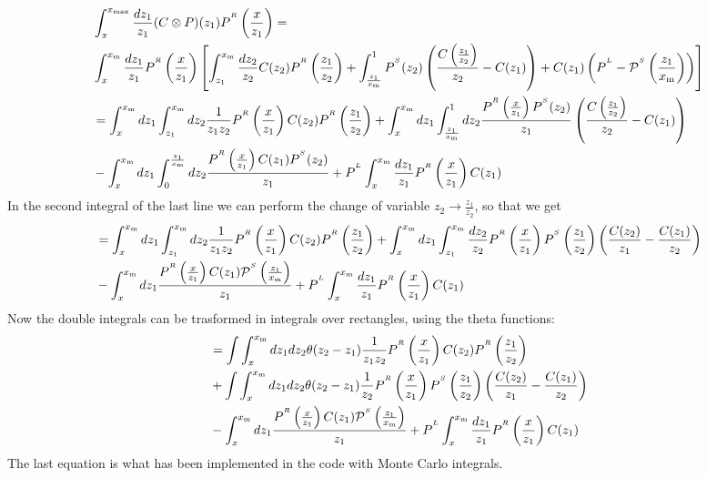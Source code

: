 \documentclass[a4paper]{article}
\newcommand{\PR}[0]{P^{^R}}
\newcommand{\PS}[0]{P^{^S}}
\newcommand{\PmS}[0]{\mathcal{P}^{^S}}
\newcommand{\PL}[0]{P^{^L}}
\newcommand{\xm}[0]{x_{\rm m}}
\newcommand{\zo}[0]{{z_1}}
\newcommand{\zt}[0]{{z_2}}
\begin{document}
\begin{equation*}
	\begin{split}
		& \int_x^{x_{\rm max}} \frac{dz_1}{z_1} (C \otimes P)(z_1) \PR \left(\frac{x}{z_1}\right)  = \\
		&\int_x^{\xm} \frac{dz_1}{z_1}\PR\left(\frac{x}{z_1}\right) \left[ \int_{\zo}^{\xm} \frac{d\zt}{\zt}C(\zt)\PR\left(\frac{\zo}{\zt}\right) +  \int_{\frac{\zo}{\xm}}^{1} \PS(\zt)\left(\frac{C\left(\frac{\zo}{\zt}\right)}{\zt}-C(\zo)\right) + C(\zo)\left(\PL - \PmS\left(\frac{\zo}{\xm}\right)\right)\right]\\
		&= \int_x^{\xm}d\zo \int_{\zo}^{\xm}d\zt \frac{1}{\zo \zt} \PR \left(\frac{x}{\zo}\right)C(\zt)\PR \left(\frac{\zo}{\zt}\right) + \int_x^{\xm}d\zo \int_{\frac{\zo}{\xm}}^{1}d\zt \frac{\PR\left(\frac{x}{\zo}\right)\PS(\zt)}{\zo} \left( \frac{C\left(\frac{\zo}{\zt}\right)}{\zt} - C(\zo) \right) \\
		&-\int_x^{\xm}d\zo \int_0^{\frac{\zo}{\xm}}d\zt\frac{\PR\left(\frac{x}{\zo}\right) C(\zo)\PS(\zt)}{\zo} + \PL \int_x^{\xm} \frac{d\zo}{\zo} \PR\left(\frac{x}{\zo}\right) C(\zo)
	\end{split}
\end{equation*}
In the second integral of the last line we can perform the change of variable $z_2 \rightarrow \frac{\zo}{\zt}$, so that we get
\begin{equation*}
	\begin{split}
		&= \int_x^{\xm}d\zo \int_{\zo}^{\xm}d\zt \frac{1}{\zo \zt} \PR \left(\frac{x}{\zo}\right)C(\zt)\PR \left(\frac{\zo}{\zt}\right) +\int_x^{\xm}d\zo \int_{\zo}^{\xm}\frac{d\zt}{\zt} \PR\left(\frac{x}{\zo}\right)\PS\left(\frac{\zo}{\zt}\right) \left( \frac{C(\zt)}{\zo} - \frac{C(\zo)}{\zt} \right) \\
		&-\int_x^{\xm}d\zo \frac{\PR\left(\frac{x}{\zo}\right) C(\zo)\PmS\left(\frac{\zo}{\xm}\right)}{\zo} + \PL \int_x^{\xm} \frac{d\zo}{\zo} \PR\left(\frac{x}{\zo}\right) C(\zo)
	\end{split}
\end{equation*}
Now the double integrals can be trasformed in integrals over rectangles, using the theta functions:
\begin{equation}
	\begin{split}
		&= \int\int_x^{\xm}d\zo d\zt \theta(\zt-\zo)\frac{1}{\zo \zt} \PR \left(\frac{x}{\zo}\right)C(\zt)\PR \left(\frac{\zo}{\zt}\right) \\
		& +\int\int_x^{\xm}d\zo d\zt \theta(\zt-\zo)\frac{1}{\zt} \PR\left(\frac{x}{\zo}\right)\PS\left(\frac{\zo}{\zt}\right) \left( \frac{C(\zt)}{\zo} - \frac{C(\zo)}{\zt} \right) \\
		&-\int_x^{\xm}d\zo \frac{\PR\left(\frac{x}{\zo}\right) C(\zo)\PmS\left(\frac{\zo}{\xm}\right)}{\zo} + \PL \int_x^{\xm} \frac{d\zo}{\zo} \PR\left(\frac{x}{\zo}\right) C(\zo)
	\end{split}
\end{equation}
The last equation is what has been implemented in the code with Monte Carlo integrals.
\end{document}
